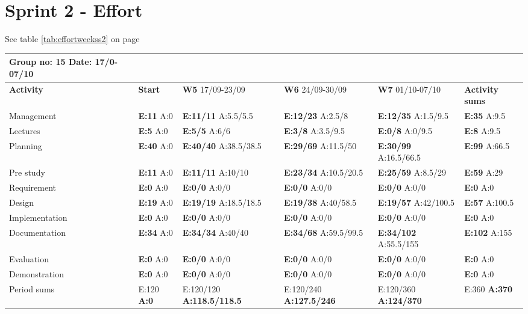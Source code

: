 \pagebreak
\section{Sprint 2 - Effort}

See table \ref{tab:effortweekss2} on page \pageref{tab:effortweekss2}
\begin{table}
\begin{tabularx}{\linewidth}{>{\setlength\hsize{.625\hsize}}X|>{\setlength\hsize{0.3\hsize}}X|>{\setlength\hsize{0.5\hsize}}X|>{\setlength\hsize{0.5\hsize}}X|>{\setlength\hsize{0.5\hsize}}X|>{\setlength\hsize{.3\hsize}}X}
Group no: 15 Date: 17/0-07/10  \\ \hline
\textbf{Activity} & \textbf{Start} & \textbf{W5} 17/09-23/09 & \textbf{W6} 24/09-30/09 & \textbf{W7} 01/10-07/10 & \textbf{Activity sums} \\ \hline \hline
Management & \textbf{E:11} A:0 & \textbf{E:11/11} A:5.5/5.5 & \textbf{E:12/23} A:2.5/8 & \textbf{E:12/35} A:1.5/9.5 & \textbf{E:35} A:9.5  \\ \hline
Lectures & \textbf{E:5} A:0 & \textbf{E:5/5} A:6/6 & \textbf{E:3/8} A:3.5/9.5 & \textbf{E:0/8} A:0/9.5 & \textbf{E:8 } A:9.5  \\ \hline
Planning & \textbf{E:40} A:0 & \textbf{E:40/40} A:38.5/38.5 & \textbf{E:29/69} A:11.5/50 & \textbf{E:30/99} A:16.5/66.5 & \textbf{E:99 } A:66.5  \\ \hline
Pre study & \textbf{E:11} A:0 & \textbf{E:11/11} A:10/10 & \textbf{E:23/34} A:10.5/20.5 & \textbf{E:25/59} A:8.5/29 & \textbf{E:59} A:29  \\ \hline
Requirement & \textbf{E:0} A:0 & \textbf{E:0/0} A:0/0 & \textbf{E:0/0} A:0/0 & \textbf{E:0/0} A:0/0 & \textbf{E:0} A:0  \\ \hline
Design & \textbf{E:19} A:0 & \textbf{E:19/19} A:18.5/18.5 & \textbf{E:19/38} A:40/58.5 & \textbf{E:19/57} A:42/100.5 & \textbf{E:57} A:100.5  \\ \hline
Implementation & \textbf{E:0} A:0 & \textbf{E:0/0} A:0/0 & \textbf{E:0/0} A:0/0 & \textbf{E:0/0} A:0/0 & \textbf{E:0} A:0  \\ \hline
Documentation & \textbf{E:34} A:0 & \textbf{E:34/34} A:40/40 & \textbf{E:34/68} A:59.5/99.5 & \textbf{E:34/102} A:55.5/155 & \textbf{E:102 } A:155  \\ \hline
Evaluation & \textbf{E:0} A:0 & \textbf{E:0/0} A:0/0 & \textbf{E:0/0} A:0/0 & \textbf{E:0/0} A:0/0 & \textbf{E:0 } A:0  \\ \hline
Demonstration & \textbf{E:0} A:0 & \textbf{E:0/0} A:0/0 & \textbf{E:0/0} A:0/0 & \textbf{E:0/0} A:0/0 & \textbf{E:0 } A:0  \\ \hline
Period sums & E:120 \textbf{A:0} & E:120/120 \textbf{A:118.5/118.5} & E:120/240 \textbf{A:127.5/246} & E:120/360 \textbf{A:124/370} & E:360 \textbf{A:370} \\ \hline
\end{tabularx}


\end{table}
